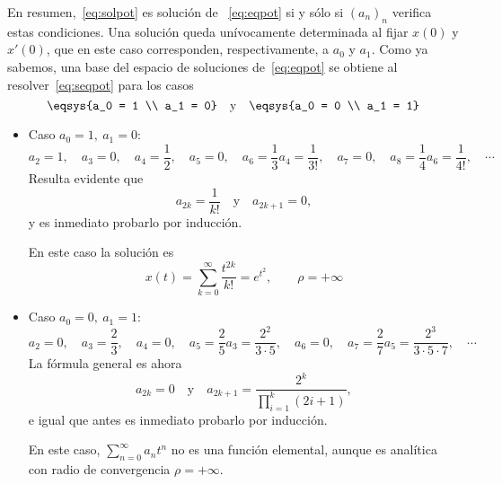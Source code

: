 \documentclass[../ecuaciones_diferenciales.tex]{subfiles}
\begin{document}
\begin{example}
	En resumen,~\eqref{eq:solpot} es solución de ~\eqref{eq:eqpot} si y sólo si
	\((a_n)_n\) verifica estas condiciones. Una solución queda unívocamente
	determinada al fijar \(x(0)\) y \(x'(0)\), que en este caso corresponden,
	respectivamente, a \(a_0\) y \(a_1\). Como ya sabemos, una base del espacio de
	soluciones de~\eqref{eq:eqpot} se obtiene al resolver~\eqref{eq:seqpot} para los
	casos
	\[\eqsys{a_0 = 1 \\ a_1 = 0}
		\quad \text{y} \quad
		\eqsys{a_0 = 0 \\ a_1 = 1}\]

	\begin{itemize}
		\item Caso \(a_0 = 1,\ a_1 = 0\):
		      \[a_2 = 1, \quad a_3 = 0, \quad a_4 = \frac{1}{2}, \quad a_5 = 0, \quad a_6 =
			      \frac{1}{3}a_4 = \frac{1}{3!}, \quad a_7 = 0, \quad a_8 = \frac{1}{4}a_6 =
			      \frac{1}{4!}, \quad \cdots\]
		      Resulta evidente que
		      \[a_{2k} = \frac{1}{k!} \quad \text{y} \quad a_{2k+1} = 0,\]
		      y es inmediato probarlo por inducción.

		      En este caso la solución es
		      \[x(t) = \sum_{k=0}^\infty \frac{t^{2k}}{k!} = e^{t^2}, \qquad \rho =
			      +\infty\]

		\item Caso \(a_0 = 0,\ a_1 = 1\):
		      \[a_2 = 0, \quad a_3 = \frac{2}{3}, \quad a_4 = 0, \quad a_5 = \frac{2}{5}a_3
			      = \frac{2^2}{3 \cdot 5}, \quad a_6 = 0, \quad a_7 = \frac{2}{7}a_5 =
			      \frac{2^3}{3 \cdot 5 \cdot 7}, \quad \cdots\]
		      La fórmula general es ahora
		      \[a_{2k} = 0 \quad \text{y} \quad a_{2k+1} = \frac{2^k}{\prod_{i=1}^k
				      (2i+1)},\]
		      e igual que antes es inmediato probarlo por inducción.

		      En este caso, \(\sum_{n=0}^\infty a_nt^n\) no es una función
		      elemental, aunque es analítica con radio de
		      convergencia \(\rho = +\infty\).
	\end{itemize}
\end{example}
\end{document}
